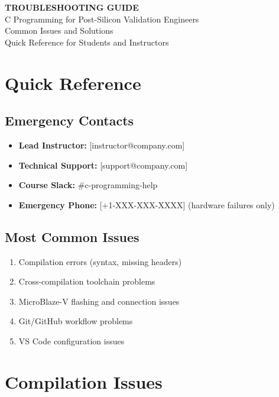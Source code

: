 \documentclass[11pt,a4paper]{article}
\begin{document}
\begin{center}
    {\Huge\bfseries\color{codeblue} TROUBLESHOOTING GUIDE}\\[0.5cm]
    {\Large C Programming for Post-Silicon Validation Engineers}\\[0.3cm]
    {\large Common Issues and Solutions}\\[0.2cm]
    {\normalsize Quick Reference for Students and Instructors}
\end{center}

\vspace{1cm}

\section{Quick Reference}

\subsection{Emergency Contacts}
\begin{itemize}
    \item \textbf{Lead Instructor:} [instructor@company.com]
    \item \textbf{Technical Support:} [support@company.com]
    \item \textbf{Course Slack:} \#c-programming-help
    \item \textbf{Emergency Phone:} [+1-XXX-XXX-XXXX] (hardware failures only)
\end{itemize}

\subsection{Most Common Issues}
\begin{enumerate}
    \item Compilation errors (syntax, missing headers)
    \item Cross-compilation toolchain problems
    \item MicroBlaze-V flashing and connection issues
    \item Git/GitHub workflow problems
    \item VS Code configuration issues
\end{enumerate}

\section{Compilation Issues}
\end{document}
